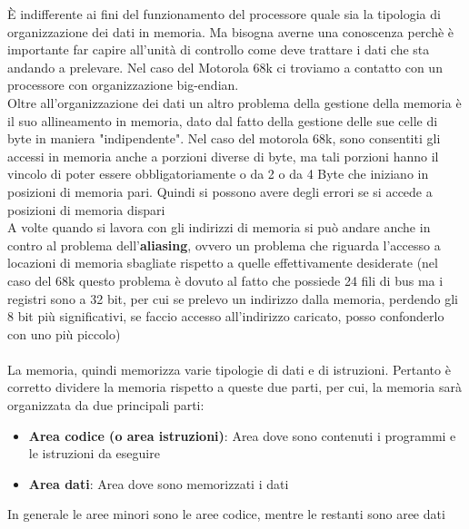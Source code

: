 \MakeUppercase{è} indifferente ai fini del funzionamento del processore quale sia la tipologia di organizzazione dei dati in memoria. Ma bisogna averne una conoscenza perchè è importante far capire all'unità di controllo come deve trattare i dati che sta andando a prelevare. Nel caso del Motorola 68k ci troviamo a contatto con un processore con organizzazione big-endian.
\\
Oltre all'organizzazione dei dati un altro problema della gestione della memoria è il suo allineamento in memoria, dato dal fatto della gestione delle sue celle di byte in maniera "indipendente".
Nel caso del motorola 68k, sono consentiti gli accessi in memoria anche a porzioni diverse di byte, ma tali porzioni hanno il vincolo di poter essere obbligatoriamente o da 2 o da 4 Byte che iniziano in posizioni di memoria pari. Quindi si possono avere degli errori se si accede a posizioni di memoria dispari
\\
A volte quando si lavora con gli indirizzi di memoria si può andare anche in contro al problema dell'\textbf{aliasing}, ovvero un problema che riguarda l'accesso a locazioni di memoria sbagliate rispetto a quelle effettivamente desiderate (nel caso del 68k questo problema è dovuto al fatto che possiede 24 fili di bus ma i registri sono a 32 bit, per cui se prelevo un indirizzo dalla memoria, perdendo gli 8 bit più significativi, se faccio accesso all'indirizzo caricato, posso confonderlo con uno più piccolo)
\\
\\
La memoria, quindi memorizza varie tipologie di dati e di istruzioni. Pertanto è corretto dividere la memoria rispetto a queste due parti, per cui, la memoria sarà organizzata da due principali parti:

\begin{itemize}
    \item \textbf{Area codice (o area istruzioni)}: Area dove sono contenuti i programmi e le istruzioni da eseguire
    \item \textbf{Area dati}: Area dove sono memorizzati i dati
\end{itemize}

In generale le aree minori sono le aree codice, mentre le restanti sono aree dati

